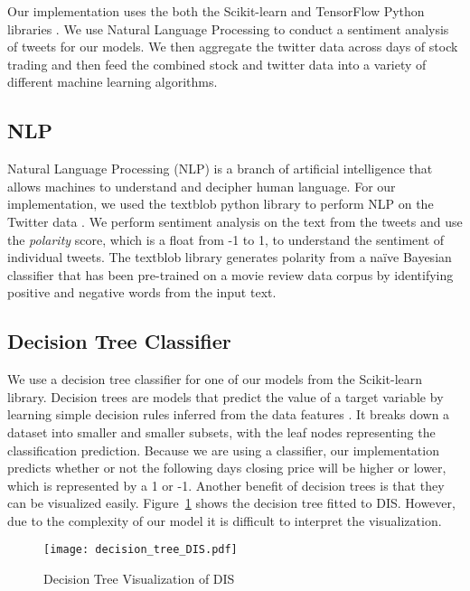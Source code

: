 \documentclass[../thesis.tex]{subfiles}
\begin{document}
Our implementation uses the both the Scikit-learn and TensorFlow Python libraries \cite{PedregosaFABIANPEDREGOSA2011} \cite{Abadi}. We use Natural Language Processing to conduct a sentiment analysis of tweets for our models. We then aggregate the twitter data across days of stock trading and then feed the combined stock and twitter data into a variety of different machine learning algorithms. 

\subsection{NLP}
Natural Language Processing (NLP) is a branch of artificial intelligence that allows machines to understand and decipher human language. For our implementation, we used the textblob python library to perform NLP on the Twitter data \cite{Loria2018}. We perform sentiment analysis on the text from the tweets and use the \textit{polarity} score, which is a float from -1 to 1, to understand the sentiment of individual tweets. The textblob library generates polarity from a na\"{i}ve Bayesian classifier that has been pre-trained on a movie review data corpus by identifying positive and negative words from the input text. 

\subsection{Decision Tree Classifier}
We use a decision tree classifier for one of our models from the Scikit-learn library. Decision trees are models that predict the value of a target variable by learning simple decision rules inferred from the data features \cite{PedregosaFABIANPEDREGOSA2011}. It breaks down a dataset into smaller and smaller subsets, with the leaf nodes  representing the classification prediction. Because we are using a classifier, our implementation predicts whether or not the following days closing price will be higher or lower, which is represented by a 1 or -1. Another benefit of decision trees is that they can be visualized easily. Figure~\ref{DecTreefigure} shows the decision tree fitted to DIS. However, due to the complexity of our model it is difficult to interpret the visualization. 

\begin{figure}[h]
\centering
\texttt{[image: decision\_tree\_DIS.pdf]}
\caption{Decision Tree Visualization of DIS \label{overflow}}
\label{DecTreefigure}
\end{figure}
\end{document}
